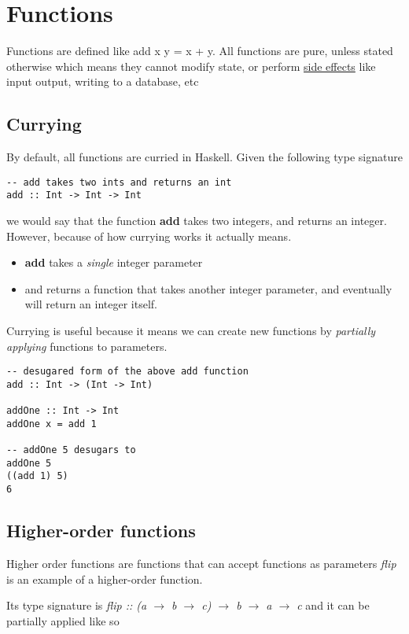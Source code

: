 \section{Functions}
Functions are defined like add x y = x + y. All functions are pure, unless stated otherwise which means
they cannot modify state, or perform \underline{side effects} like input output, writing to a database, etc

\subsection{Currying}
By default, all functions are curried in Haskell. Given the following type signature

\begin{lstlisting}
-- add takes two ints and returns an int
add :: Int -> Int -> Int
\end{lstlisting}

we would say that the function \textbf{add} takes two integers, and returns an integer.
However, because of how currying works it actually means.

\begin{itemize}
    \item \textbf{add} takes a \emph{single} integer parameter
    \item and returns a function that takes another integer parameter, and eventually
    will return an integer itself.
\end{itemize}

Currying is useful because it means we can create new functions by \emph{partially applying}
functions to parameters.

\begin{lstlisting}
-- desugared form of the above add function
add :: Int -> (Int -> Int)

addOne :: Int -> Int
addOne x = add 1

-- addOne 5 desugars to
addOne 5
((add 1) 5)
6
\end{lstlisting}

\subsection{Higher-order functions}
Higher order functions are functions that can accept functions as parameters
\emph{flip} is an example of a higher-order function.

Its type signature is \emph{flip :: (a $\rightarrow$ b $\rightarrow$ c) $\rightarrow$ b $\rightarrow$ a $\rightarrow$ c}
and it can be partially applied like so

